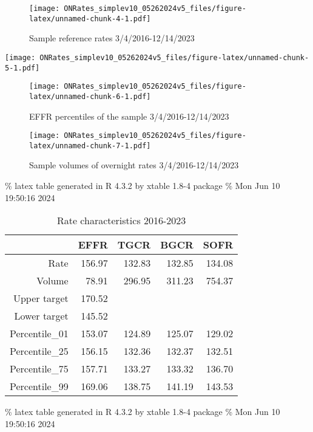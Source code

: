 \documentclass[
]{article}
\begin{document}
\begin{figure}
\centering
\texttt{[image: ONRates\_simplev10\_05262024v5\_files/figure-latex/unnamed-chunk-4-1.pdf]}
\caption{\label{fig:unnamed-chunk-4}Sample reference rates 3/4/2016-12/14/2023}
\end{figure}

\newpage

\texttt{[image: ONRates\_simplev10\_05262024v5\_files/figure-latex/unnamed-chunk-5-1.pdf]}

\begin{figure}
\centering
\texttt{[image: ONRates\_simplev10\_05262024v5\_files/figure-latex/unnamed-chunk-6-1.pdf]}
\caption{\label{fig:unnamed-chunk-6}EFFR percentiles of the sample 3/4/2016-12/14/2023}
\end{figure}

\begin{figure}
\centering
\texttt{[image: ONRates\_simplev10\_05262024v5\_files/figure-latex/unnamed-chunk-7-1.pdf]}
\caption{\label{fig:unnamed-chunk-7}Sample volumes of overnight rates 3/4/2016-12/14/2023}
\end{figure}

\% latex table generated in R 4.3.2 by xtable 1.8-4 package
\% Mon Jun 10 19:50:16 2024

\begin{table}[ht]
\centering
\begin{tabular}{rrrrr}
  \hline
 & EFFR & TGCR & BGCR & SOFR \\ 
  \hline
Rate & 156.97 & 132.83 & 132.85 & 134.08 \\ 
  Volume & 78.91 & 296.95 & 311.23 & 754.37 \\ 
  Upper target & 170.52 &  &  &  \\ 
  Lower target & 145.52 &  &  &  \\ 
  Percentile\_01 & 153.07 & 124.89 & 125.07 & 129.02 \\ 
  Percentile\_25 & 156.15 & 132.36 & 132.37 & 132.51 \\ 
  Percentile\_75 & 157.71 & 133.27 & 133.32 & 136.70 \\ 
  Percentile\_99 & 169.06 & 138.75 & 141.19 & 143.53 \\ 
   \hline
\end{tabular}
\caption{Rate characteristics 2016-2023} 
\label{tab:Rate characteristics 2016-2023}
\end{table}

\% latex table generated in R 4.3.2 by xtable 1.8-4 package
\% Mon Jun 10 19:50:16 2024
\end{document}
